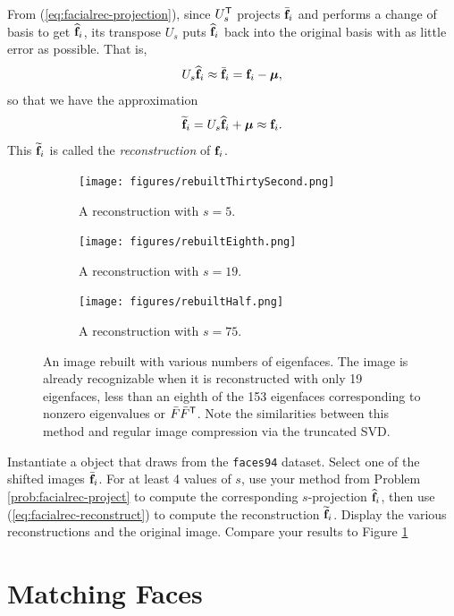 From (\ref{eq:facialrec-projection}), since $U_s^{\mathsf T}$ projects $\bar{\mathbf{f}}_i$ and performs a change of basis to get $\widehat{\mathbf{f}}_i$, its transpose $U_s$ puts $\widehat{\mathbf{f}}_i$ back into the original basis with as little error as possible.
That is,
\[
U_s \widehat{\mathbf{f}}_i \approx \bar{\mathbf{f}}_i = \mathbf{f}_i - \boldsymbol{\mu},
\]
so that we have the approximation
\begin{equation}
\widetilde{\mathbf{f}}_i = U_s \widehat{\mathbf{f}}_i + \boldsymbol{\mu} \approx \mathbf{f}_i.
\label{eq:facialrec-reconstruct}
\end{equation}
This $\widetilde{\mathbf{f}}_i$ is called the \emph{reconstruction} of $\mathbf{f}_i$.

\begin{figure}[H]
\begin{subfigure}{0.32\textwidth}
    \texttt{[image: figures/rebuiltThirtySecond.png]}
    \caption{A reconstruction with $s=5$.}
\end{subfigure}
\begin{subfigure}{0.32\textwidth}
    \texttt{[image: figures/rebuiltEighth.png]}
    \caption{A reconstruction with $s=19$.}
\end{subfigure}
\begin{subfigure}{0.32\textwidth}
    \texttt{[image: figures/rebuiltHalf.png]}
    \caption{A reconstruction with $s=75$.}
\end{subfigure}
\caption{An image rebuilt with various numbers of eigenfaces. The image is already recognizable when it is reconstructed with only 19 eigenfaces, less than an eighth of the 153 eigenfaces corresponding to nonzero eigenvalues or $\bar{F}\bar{F}^{\mathsf T}$.
Note the similarities between this method and regular image compression via the truncated SVD.}
\label{fig:rebuiltImage}
\end{figure}

\begin{problem}
Instantiate a  object that draws from the \texttt{faces94} dataset.
Select one of the shifted images $\bar{\mathbf{f}}_i$.
For at least 4 values of $s$, use your method from Problem \ref{prob:facialrec-project} to compute the corresponding $s$-projection $\widehat{\mathbf{f}}_i$, then use (\ref{eq:facialrec-reconstruct}) to compute the reconstruction $\widetilde{\mathbf{f}}_i$.
Display the various reconstructions and the original image.
Compare your results to Figure \ref{fig:rebuiltImage}
\end{problem}

\section*{Matching Faces} %

